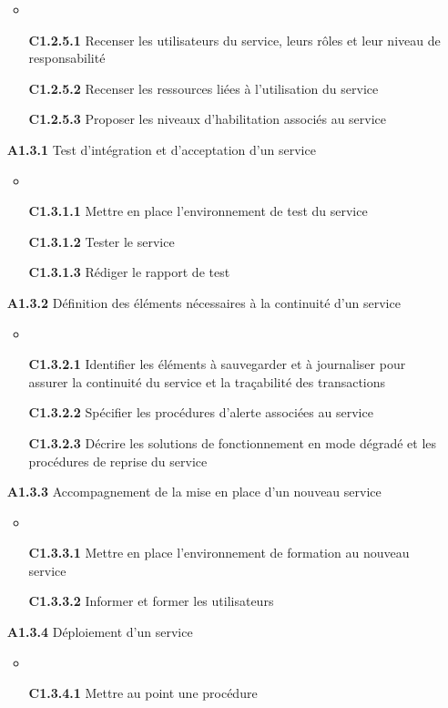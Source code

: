 \documentclass[12pt,a4paper,oneside,titlepage,final]{article}
\begin{document}
\begin{enumerate}
\begin{itemize}
    \item \item [\textbf{C1.2.5.1}] Recenser les utilisateurs du
    service, leurs rôles et leur niveau de responsabilité
    \item [\textbf{C1.2.5.2}] Recenser les ressources liées à
    l'utilisation du service
    \item [\textbf{C1.2.5.3}] Proposer les niveaux d'habilitation
    associés au service
  \end{itemize}
  \item [\textbf{A1.3.1}] Test d'intégration et d'acceptation d'un
  service
  \begin{itemize}
    \item \item [\textbf{C1.3.1.1}] Mettre en place l'environnement de
    test du service
    \item [\textbf{C1.3.1.2}] Tester le service
    \item [\textbf{C1.3.1.3}] Rédiger le rapport de test
  \end{itemize}
  \item [\textbf{A1.3.2}] Définition des éléments nécessaires à la
  continuité d'un service
  \begin{itemize}
    \item \item [\textbf{C1.3.2.1}] Identifier les éléments à
    sauvegarder et à journaliser pour assurer la continuité du service
    et la traçabilité des transactions
    \item [\textbf{C1.3.2.2}] Spécifier les procédures d'alerte
    associées au service
    \item [\textbf{C1.3.2.3}] Décrire les solutions de fonctionnement
    en mode dégradé et les procédures de reprise du service
  \end{itemize}
  \item [\textbf{A1.3.3}] Accompagnement de la mise en place d'un
  nouveau service
  \begin{itemize}
    \item \item [\textbf{C1.3.3.1}] Mettre en place l'environnement de
    formation au nouveau service
    \item [\textbf{C1.3.3.2}] Informer et former les utilisateurs
  \end{itemize}
  \item [\textbf{A1.3.4}] Déploiement d'un service
  \begin{itemize}
    \item \item [\textbf{C1.3.4.1}] Mettre au point une procédure

\end{itemize}
\end{enumerate}
\end{document}
